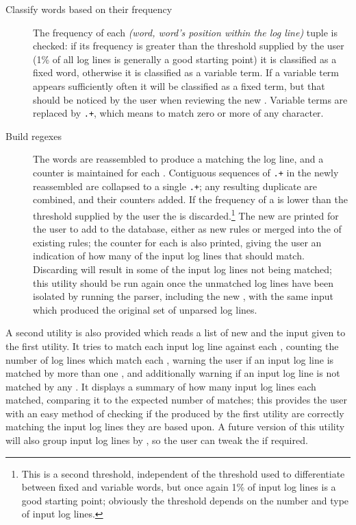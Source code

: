 \documentclass[a4paper,12pt,draft]{article}
\begin{document}
\begin{description}
    \item [Classify words based on their frequency]  The frequency of each
        \textit{(word, word's position within the log line)\/} tuple is
        checked: if its frequency is greater than the threshold supplied by
        the user (1\% of all log lines is generally a good starting point)
        it is classified as a fixed word, otherwise it is classified as a
        variable term.  If a variable term appears sufficiently often it
        will be classified as a fixed term, but that should be noticed by
        the user when reviewing the new \regexes{}.  Variable terms are
        replaced by \texttt{.+}, which means to match zero or more of any
        character.  

    \item [Build regexes]  The words are reassembled to produce a \regex{}
        matching the log line, and a counter is maintained for each
        \regex{}.  Contiguous sequences of \texttt{.+} in the newly
        reassembled \regexes{} are collapsed to a single \texttt{.+}; any
        resulting duplicate \regexes{} are combined, and their counters
        added.  If the frequency of a \regex{} is lower than the threshold
        supplied by the user the \regex{} is discarded.\footnote{This is a
        second threshold, independent of the threshold used to
        differentiate between fixed and variable words, but once again 1\%
        of input log lines is a good starting point; obviously the
        threshold depends on the number and type of input log lines.}  The
        new \regexes{} are printed for the user to add to the database,
        either as new rules or merged into the \regexes{} of existing
        rules; the counter for each \regex{} is also printed, giving the
        user an indication of how many of the input log lines that \regex{}
        should match.  Discarding \regexes{} will result in some of the
        input log lines not being matched; this utility should be run again
        once the unmatched log lines have been isolated by running the
        parser, including the new \regexes{}, with the same input which
        produced the original set of unparsed log lines.

\end{description}

A second utility is also provided which reads a list of new \regexes{} and
the input given to the first utility.  It tries to match each input log
line against each \regex{}, counting the number of log lines which match
each \regex{}, warning the user if an input log line is matched by more
than one \regex{}, and additionally warning if an input log line is not
matched by any \regex{}.  It displays a summary of how many input log lines
each \regex{} matched, comparing it to the expected number of matches; this
provides the user with an easy method of checking if the \regexes{}
produced by the first utility are correctly matching the input log lines
they are based upon.  A future version of this utility will also group
input log lines by \regex{}, so the user can tweak the \regexes{} if
required.
\end{document}
